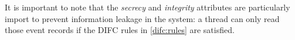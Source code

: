 It is important to note that the \emph{secrecy} and \emph{integrity} attributes are particularly import to prevent information leakage in the system: a thread can only read those event records if the DIFC rules in \ref{difc:rules} are satisfied.










